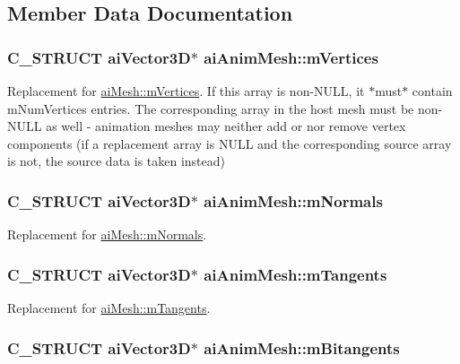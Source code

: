 \subsection{Member Data Documentation}
\hypertarget{structai_anim_mesh_0ac2dd4c1afd23e6a9293b1d0ded3060}{
\subsubsection[mVertices]{\setlength{\rightskip}{0pt plus 5cm}C\_\-STRUCT aiVector3D$\ast$ {\bf aiAnimMesh::mVertices}}}
\label{structai_anim_mesh_0ac2dd4c1afd23e6a9293b1d0ded3060}


Replacement for \hyperlink{structai_mesh_fd4588abb3e1c72821ae0234a3850662}{aiMesh::mVertices}. If this array is non-NULL, it $\ast$must$\ast$ contain mNumVertices entries. The corresponding array in the host mesh must be non-NULL as well - animation meshes may neither add or nor remove vertex components (if a replacement array is NULL and the corresponding source array is not, the source data is taken instead) \hypertarget{structai_anim_mesh_64a07a8c5c419b1e006c5302bca4d334}{
\subsubsection[mNormals]{\setlength{\rightskip}{0pt plus 5cm}C\_\-STRUCT aiVector3D$\ast$ {\bf aiAnimMesh::mNormals}}}
\label{structai_anim_mesh_64a07a8c5c419b1e006c5302bca4d334}


Replacement for \hyperlink{structai_mesh_ec81b496b4d93838cef038933dabe9b9}{aiMesh::mNormals}. \hypertarget{structai_anim_mesh_95dcc49c6d5ecc570ceb54552a0a9625}{
\subsubsection[mTangents]{\setlength{\rightskip}{0pt plus 5cm}C\_\-STRUCT aiVector3D$\ast$ {\bf aiAnimMesh::mTangents}}}
\label{structai_anim_mesh_95dcc49c6d5ecc570ceb54552a0a9625}


Replacement for \hyperlink{structai_mesh_f367ff78bd69f3e83d7edc8ad67dc5df}{aiMesh::mTangents}. \hypertarget{structai_anim_mesh_7d60acf4d2b4b59dcc6c88956bfae85f}{
\subsubsection[mBitangents]{\setlength{\rightskip}{0pt plus 5cm}C\_\-STRUCT aiVector3D$\ast$ {\bf aiAnimMesh::mBitangents}}}
\label{structai_anim_mesh_7d60acf4d2b4b59dcc6c88956bfae85f}


